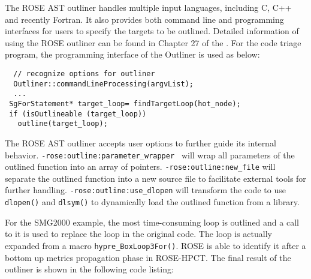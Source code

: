 The ROSE AST outliner handles multiple input languages, including C, C++ and
recently Fortran.  It also provides both command line and programming interfaces for users
to specify the targets to be outlined.  
Detailed information of using the ROSE outliner can be found in
Chapter 27 of the .
For the code triage program, the programming interface of the Outliner is
used as below:

{\mySmallFontSize
\begin{verbatim}
  // recognize options for outliner
  Outliner::commandLineProcessing(argvList);
  ...
 SgForStatement* target_loop= findTargetLoop(hot_node);
 if (isOutlineable (target_loop))  
   outline(target_loop);
\end{verbatim}
}

The ROSE AST outliner accepts user options to further guide its internal
behavior. \lstinline{-rose:outline:parameter_wrapper } will wrap all
parameters of the outlined function into an array of pointers. 
\lstinline{-rose:outline:new_file} will separate the outlined function into
a new source file to facilitate external tools for further handling.
\lstinline{-rose:outline:use_dlopen} will transform the code to use
\lstinline{dlopen()} and \lstinline{dlsym()} to dynamically load the
outlined function from a library.

For the SMG2000 example, the most time-consuming loop is outlined and a call to it is used
to replace the loop in the original code. 
The loop is actually expanded from a macro
\lstinline{hypre_BoxLoop3For()}. 
ROSE is able to identify it after a bottom
up metrics propagation phase in ROSE-HPCT. 
The final result of the outliner is shown in the following code listing:




